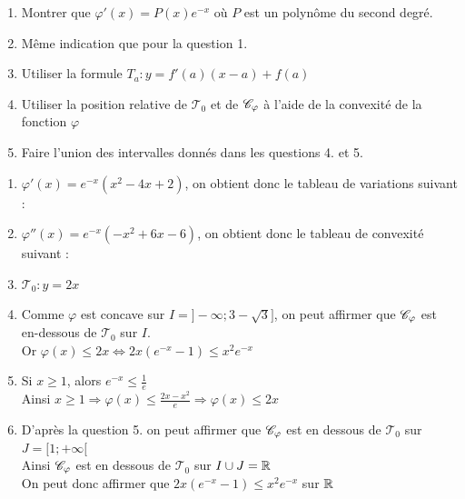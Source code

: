 \documentclass[oneside,12pt]{book}          %
\begin{document}
\begin{hint}
	\begin{enumerate}
		\item Montrer que $\varphi'(x)=P(x)e^{-x}$ où $P$ est un polynôme du second degré.
		\item Même indication que pour la question 1.
		\item Utiliser la formule $T_a:y=f'(a)(x-a)+f(a)$
		\item Utiliser la position relative de $\mathcal{T}_0$ et de ${\mathscr{C}}_\varphi$ à l'aide de la convexité de la fonction $\varphi$
		\item[6.] Faire l'union des intervalles donnés dans les questions 4. et 5.
	\end{enumerate}
\end{hint}
\begin{sol}
	\begin{enumerate}
		\item $\varphi'(x)=e^{-x}(x^2-4x+2)$, on obtient donc le tableau de variations suivant :
		
		\item $\varphi''(x)=e^{-x}(-x^2+6x-6)$, on obtient donc le tableau de convexité suivant :
		
		\item $\mathcal{T}_0:y=2x$
		\item Comme $\varphi$ est concave sur $I=]-\infty;3-\sqrt{3}]$, on peut affirmer que ${\mathscr{C}}_\varphi$ est en-dessous de $\mathcal{T}_0$ sur $I$.\\
		Or $\varphi(x)\leq2x \Leftrightarrow 2x(e^{-x}-1)\leq x^2e^{-x}$
		\item Si $x\geq1$, alors $e^{-x}\leq \frac{1}{e}$\\
		Ainsi $x\geq1 \Rightarrow \varphi(x)\leq\frac{2x-x^2}{e} \Rightarrow \varphi(x)\leq 2x$
		\item D'après la question 5. on peut affirmer que ${\mathscr{C}}_\varphi$ est en dessous de $\mathcal{T}_0$ sur $J=[1;+\infty[$\\
		Ainsi ${\mathscr{C}}_\varphi$ est en dessous de $\mathcal{T}_0$ sur $I\cup J={\mathbb R}$\\
		On peut donc affirmer que $2x(e^{-x}-1)\leq x^2e^{-x}$ sur ${\mathbb R}$
	\end{enumerate}
\end{sol}
\end{document}

